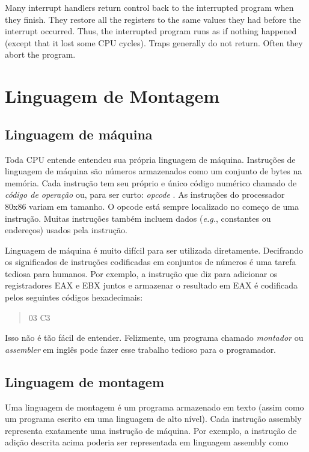 Many interrupt handlers return control back to the interrupted program
when they finish. They restore all the registers to the same values
they had before the interrupt occurred. Thus, the interrupted program
runs as if nothing happened (except that it lost some CPU
cycles). Traps generally do not return. Often they abort the program.

\section{Linguagem de Montagem}

\subsection{Linguagem de máquina}

Toda CPU entende entendeu sua própria linguagem de máquina. Instruções
de linguagem de máquina são números armazenados como um conjunto de bytes
na memória. Cada instrução tem seu próprio e único código numérico chamado
de \emph{código de operação} ou, para ser curto: \emph{opcode}
. As instruções do processador 80x86 variam em tamanho. O
opcode está sempre localizado no começo de uma instrução. Muitas instruções
também incluem dados ({\em e.g.}, constantes ou endereços) usados pela
instrução.

Linguagem de máquina é muito difícil para ser utilizada diretamente.
Decifrando os significados de instruções codificadas em conjuntos de números
é uma tarefa tediosa para humanos. Por exemplo, a instrução que diz para
adicionar os registradores EAX e EBX juntos e armazenar o resultado em EAX
é codificada pelos seguintes códigos hexadecimais:
\begin{quote}
   03 C3
\end{quote}
Isso não é tão fácil de entender. Felizmente, um programa chamado
\emph{montador} ou \emph{assembler} em inglês  pode fazer
esse trabalho tedioso para o programador.

\subsection{Linguagem de montagem}

Uma linguagem de montagem é um programa armazenado em texto (assim como um
programa escrito em uma linguagem de alto nível). Cada instrução assembly
representa exatamente uma instrução de máquina. Por exemplo, a instrução de
adição descrita acima poderia ser representada em linguagem assembly como

